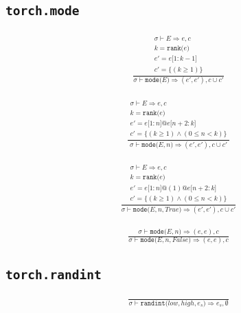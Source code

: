 \documentclass{article}
\makeatletter
\newcommand{\Rar}{\Rightarrow}
\newcommand{\mtt}[1]{\mathtt{#1}}
\newcommand{\op}[2]{\mtt{#1(}#2\mtt{)}}
\newcommand{\conc}{\mtt{@}}
\newcommand{\indr}[2]{\mtt{[}#1\mtt{:}#2\mtt{]}}
\makeatother
\begin{document}
\subsection*{\texttt{torch.mode}}%
\begin{align*}
  \frac
  {
    \begin{array}{l}
      \sigma \vdash E \Rar e, c \\
      k = \op{rank}{e} \\
      e' = e \indr{1}{k-1} \\
      c' = \{ (k \geq 1) \}
    \end{array}
  }
  {
    \sigma \vdash \op{mode}{E} \Rar (e', e'), c \cup c'
  }
  \tag*{tuple 형태로 반환}
\end{align*}

\begin{align*}
  \frac
  {
    \begin{array}{l}
      \sigma \vdash E \Rar e, c \\
      k = \op{rank}{e} \\
      e' = e \indr{1}{n} \conc e \indr{n+2}{k} \\
      c' = \{ (k \geq 1) \land (0 \leq n < k) \}
    \end{array}
  }
  {
    \sigma \vdash \op{mode}{E, n} \Rar (e', e'), c \cup c'
  }
  \tag*{tuple 형태로 반환}
\end{align*}

\begin{align*}
  \frac
  {
    \begin{array}{l}
      \sigma \vdash E \Rar e, c \\
      k = \op{rank}{e} \\
      e' = e \indr{1}{n} \conc (1) \conc e \indr{n+2}{k} \\
      c' = \{ (k \geq 1) \land (0 \leq n < k) \}
    \end{array}
  }
  {
    \sigma \vdash \op{mode}{E, n, True} \Rar (e', e'), c \cup c'
  }
  \tag*{tuple 형태로 반환}
\end{align*}

\begin{align*}
  \frac
  {
    \sigma \vdash \op{mode}{E, n} \Rar (e, e), c
  }
  {
    \sigma \vdash \op{mode}{E, n, False} \Rar (e, e), c
  }
  \tag*{tuple 형태로 반환}
\end{align*}%

\subsection*{\texttt{torch.randint}}%
\begin{align*}
  \frac
  {
  }
  {
    \sigma \vdash \op{randint}{low, high, e_s} \Rar e_s, \emptyset
  }
\end{align*}
\end{document}
